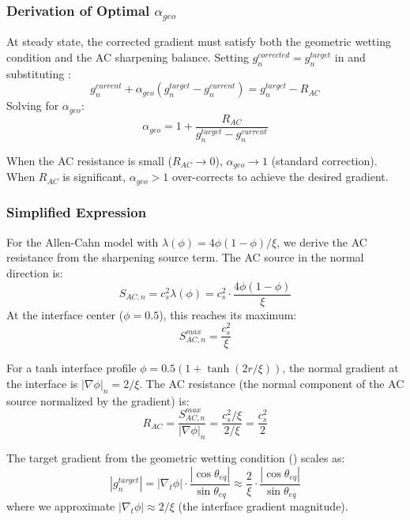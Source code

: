 \subsubsection{Derivation of Optimal $\alpha_{geo}$}

At steady state, the corrected gradient must satisfy both the geometric wetting condition and the AC sharpening balance. Setting $g_n^{corrected} = g_n^{target}$ in  and substituting :
\begin{equation}
    g_n^{current} + \alpha_{geo}(g_n^{target} - g_n^{current}) = g_n^{target} - R_{AC}
\end{equation}
Solving for $\alpha_{geo}$:
\begin{equation}\label{eq:alpha_derivation}
    \alpha_{geo} = 1 + \frac{R_{AC}}{g_n^{target} - g_n^{current}}
\end{equation}

When the AC resistance is small ($R_{AC} \to 0$), $\alpha_{geo} \to 1$ (standard correction). When $R_{AC}$ is significant, $\alpha_{geo} > 1$ over-corrects to achieve the desired gradient.

\subsubsection{Simplified Expression}

For the Allen-Cahn model with $\lambda(\phi) = 4\phi(1-\phi)/\xi$, we derive the AC resistance from the sharpening source term. The AC source in the normal direction is:
\begin{equation}
    S_{AC,n} = c_s^2 \lambda(\phi) = c_s^2 \cdot \frac{4\phi(1-\phi)}{\xi}
\end{equation}
At the interface center ($\phi = 0.5$), this reaches its maximum:
\begin{equation}
    S_{AC,n}^{max} = \frac{c_s^2}{\xi}
\end{equation}

For a tanh interface profile $\phi = 0.5(1 + \tanh(2r/\xi))$, the normal gradient at the interface is $|\nabla\phi|_n = 2/\xi$. The AC resistance (the normal component of the AC source normalized by the gradient) is:
\begin{equation}
    R_{AC} = \frac{S_{AC,n}^{max}}{|\nabla\phi|_n} = \frac{c_s^2 / \xi}{2/\xi} = \frac{c_s^2}{2}
\end{equation}

The target gradient from the geometric wetting condition () scales as:
\begin{equation}
    |g_n^{target}| = |\nabla_t\phi| \cdot \frac{|\cos\theta_{eq}|}{\sin\theta_{eq}} \approx \frac{2}{\xi} \cdot \frac{|\cos\theta_{eq}|}{\sin\theta_{eq}}
\end{equation}
where we approximate $|\nabla_t\phi| \approx 2/\xi$ (the interface gradient magnitude).


